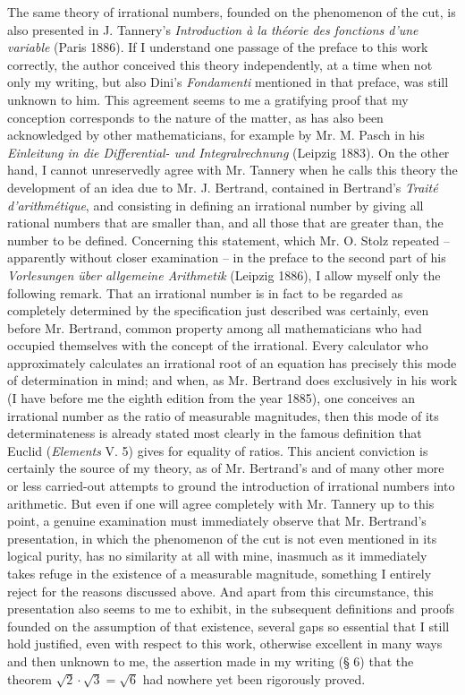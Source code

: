 \documentclass[11pt]{article}
\begin{document}
The same theory of irrational numbers, founded on the phenomenon of the cut, is also presented in J. Tannery's \emph{Introduction à la théorie des fonctions d'une variable} (Paris 1886). If I understand one passage of the preface to this work correctly, the author conceived this theory independently, at a time when not only my writing, but also Dini's \emph{Fondamenti} mentioned in that preface, was still unknown to him. This agreement seems to me a gratifying proof that my conception corresponds to the nature of the matter, as has also been acknowledged by other mathematicians, for example by Mr. M. Pasch in his \emph{Einleitung in die Differential- und Integralrechnung} (Leipzig 1883). On the other hand, I cannot unreservedly agree with Mr. Tannery when he calls this theory the development of an idea due to Mr. J. Bertrand, contained in Bertrand's \emph{Traité d'arithmétique}, and consisting in defining an irrational number by giving all rational numbers that are smaller than, and all those that are greater than, the number to be defined. Concerning this statement, which Mr. O. Stolz repeated -- apparently without closer examination -- in the preface to the second part of his \emph{Vorlesungen über allgemeine Arithmetik} (Leipzig 1886), I allow myself only the following remark. That an irrational number is in fact to be regarded as completely determined by the specification just described was certainly, even before Mr. Bertrand, common property among all mathematicians who had occupied themselves with the concept of the irrational. Every calculator who approximately calculates an irrational root of an equation has precisely this mode of determination in mind; and when, as Mr. Bertrand does exclusively in his work (I have before me the eighth edition from the year 1885), one conceives an irrational number as the ratio of measurable magnitudes, then this mode of its determinateness is already stated most clearly in the famous definition that Euclid (\emph{Elements} V. 5) gives for equality of ratios. This ancient conviction is certainly the source of my theory, as of Mr. Bertrand's and of many other more or less carried-out attempts to ground the introduction of irrational numbers into arithmetic. But even if one will agree completely with Mr. Tannery up to this point, a genuine examination must immediately observe that Mr. Bertrand's presentation, in which the phenomenon of the cut is not even mentioned in its logical purity, has no similarity at all with mine, inasmuch as it immediately takes refuge in the existence of a measurable magnitude, something I entirely reject for the reasons discussed above. And apart from this circumstance, this presentation also seems to me to exhibit, in the subsequent definitions and proofs founded on the assumption of that existence, several gaps so essential that I still hold justified, even with respect to this work, otherwise excellent in many ways and then unknown to me, the assertion made in my writing (§ 6) that the theorem $\sqrt{2}\cdot\sqrt{3}=\sqrt{6}$ had nowhere yet been rigorously proved.
\end{document}
